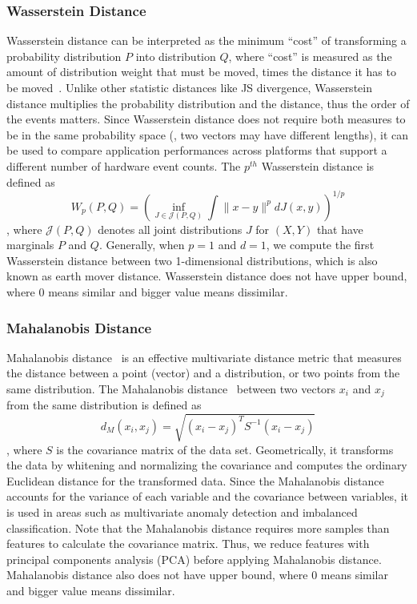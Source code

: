 \subsubsection{Wasserstein Distance}
\label{sec:wass}
Wasserstein distance\cite{rubner2000earth} can be interpreted as the minimum ``cost'' of transforming a probability distribution $P$ into distribution $Q$, where ``cost'' is measured as the amount of distribution weight that must be moved, times the distance it has to be moved~\cite{wassersteinscipy}. 
Unlike other statistic distances like JS divergence, Wasserstein distance multiplies the probability distribution and the distance, thus the order of the events matters. 
Since Wasserstein distance does not require both measures to be in the same probability space (\ie, two vectors may have different lengths), it can be used to compare application performances across platforms that support a different number of hardware event counts. The $p^{th}$ Wasserstein distance is defined as 
\begin{equation}
W_{p}(P, Q)=\left(\inf _{J \in \mathcal{J}(P, Q)} \int\|x-y\|^{p} d J(x, y)\right)^{1 / p}
\end{equation},
where $\mathcal{J}(P, Q)$ denotes all joint distributions $J$ for $(X,Y)$ that have marginals $P$ and $Q$. Generally, when $p = 1$ and $d = 1$, we compute the first Wasserstein distance between two 1-dimensional distributions, which is also known as earth mover distance. Wasserstein distance does not have upper bound, where 0 means similar and bigger value means dissimilar.

\subsubsection{Mahalanobis Distance}
Mahalanobis distance~\cite{Mah} is an effective multivariate distance metric that measures the distance between a point (vector) and a distribution, or two points from the same distribution. 
The Mahalanobis distance~\cite{Mah} between two vectors $x_i$ and $x_j$ from the same distribution is defined as
\begin{equation}d_{M}(x_i, x_j)=\sqrt{(x_i-x_j)^{T} S^{-1}(x_i-x_j)}
\end{equation}, where $S$ is the covariance matrix of the data set. Geometrically, it transforms the data by whitening and normalizing the covariance and computes the ordinary Euclidean distance for the transformed data. Since the Mahalanobis distance accounts for the variance of each variable and the covariance between variables, it is used in areas such as multivariate anomaly detection and imbalanced classification. Note that the Mahalanobis distance requires more samples than features to calculate the covariance matrix. Thus, we reduce features with principal components analysis (PCA) before applying Mahalanobis distance. Mahalanobis distance also does not have upper bound, where 0 means similar and bigger value means dissimilar.

